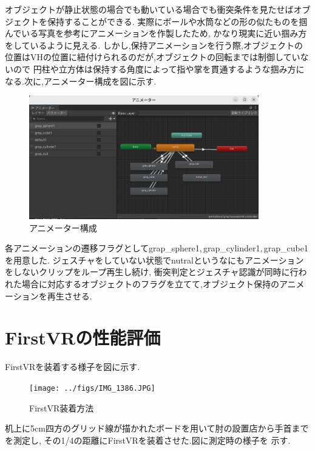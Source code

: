 \documentclass{ltjsreport}
\begin{document}
		\vspace{-15pt}
		
		オブジェクトが静止状態の場合でも動いている場合でも衝突条件を見たせばオブジェクトを保持することができる.
		実際にボールや水筒などの形の似たものを掴んでいる写真を参考にアニメーションを作製したため,
		かなり現実に近い掴み方をしているように見える.
		しかし,保持アニメーションを行う際,オブジェクトの位置はVHの位置に紐付けられるのだが,オブジェクトの回転までは制御していないので
		円柱や立方体は保持する角度によって指や掌を貫通するような掴み方になる.次に,アニメーター構成を図に示す.

		\begin{figure}[H]
		\centering
		\includegraphics[width = 10cm]{../figs/Handanimater.png}
		\caption{アニメーター構成}
		\label{fig:Handanimater}
		\end{figure}
		\vspace{-15pt}

		各アニメーションの遷移フラグとしてgrap\_sphere1,\,grap\_cylinder1,\,grap\_cube1を用意した.
		ジェスチャをしていない状態でnutralというなにもアニメーションをしないクリップをループ再生し続け,
		衝突判定とジェスチャ認識が同時に行われた場合に対応するオブジェクトのフラグを立てて,オブジェクト保持のアニメーションを再生させる.

	\section{FirstVRの性能評価}
		FirstVRを装着する様子を図に示す.
		\begin{figure}[H]
		\centering
		\texttt{[image: ../figs/IMG\_1386.JPG]}
		\caption{FirstVR装着方法}
		\label{fig:FirsrVRfit}
		\end{figure}
		\vspace{-15pt}
		机上に5cm四方のグリッド線が描かれたボードを用いて肘の設置店から手首までを測定し,
		その1/4の距離にFirstVRを装着させた.図に測定時の様子を
		示す.
\end{document}
